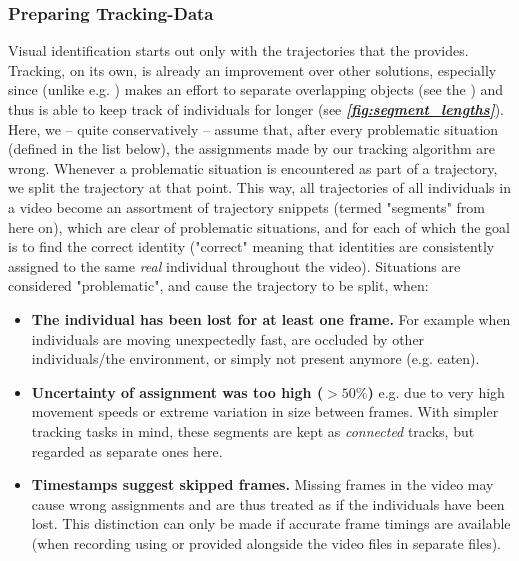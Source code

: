 \documentclass[9pt,lineno]{elife}
\newcommand{\figref}[1]{\textit{\textbf{\ref{#1}}}}
\newcommand{\idtracker}{\protect\path{ idtracker.ai}}
\newcommand{\TRex}{\protect\path{TRex}}
\newcommand{\TGrabs}{\protect\path{TGrabs}}
\begin{document}
\subsubsection{Preparing Tracking-Data} \label{sec:segments}

Visual identification starts out only with the trajectories that the  provides.
Tracking, on its own, is already an improvement over other solutions, especially since (unlike e.g. \idtracker{}) \TRex{} makes an effort to separate overlapping objects (see the ) and thus is able to keep track of individuals for longer (see \figref{fig:segment_lengths}). Here, we -- quite conservatively -- assume that, after every problematic situation (defined in the list below), the assignments made by our tracking algorithm are wrong. Whenever a problematic situation is encountered as part of a trajectory, we split the trajectory at that point. This way, all trajectories of all individuals in a video become an assortment of trajectory snippets (termed "segments" from here on), which are clear of problematic situations, and for each of which the goal is to find the correct identity ("correct" meaning that identities are consistently assigned to the same \textit{real} individual throughout the video). Situations are considered "problematic", and cause the trajectory to be split, when:



\begin{itemize}[label=\textnormal{$\bullet$}]
  \item \textbf{The individual has been lost for at least one frame.} For example when individuals are moving unexpectedly fast, are occluded by other individuals/the environment, or simply not present anymore (e.g. eaten).
  \item \textbf{Uncertainty of assignment was too high ($>50\%$)} e.g. due to very high movement speeds or extreme variation in size between frames. With simpler tracking tasks in mind, these segments are kept as \emph{connected} tracks, but regarded as separate ones here.
  \item \textbf{Timestamps suggest skipped frames.} Missing frames in the video may cause wrong assignments and are thus treated as if the individuals have been lost. This distinction can only be made if accurate frame timings are available (when recording using \TGrabs{} or provided alongside the video files in separate \protect{} files).
\end{itemize}
\end{document}
